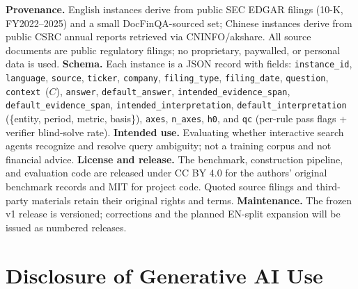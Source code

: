\textbf{Provenance.} English instances derive from public SEC EDGAR filings
(10-K, FY2022--2025) and a small DocFinQA-sourced set; Chinese instances derive
from public CSRC annual reports retrieved via CNINFO/akshare. All source
documents are public regulatory filings; no proprietary, paywalled, or
personal data is used. \textbf{Schema.} Each instance is a JSON record with
fields: \texttt{instance\_id}, \texttt{language}, \texttt{source}, \texttt{ticker},
\texttt{company}, \texttt{filing\_type}, \texttt{filing\_date}, \texttt{question},
\texttt{context}~($C$), \texttt{answer}, \texttt{default\_answer},
\texttt{intended\_evidence\_span}, \texttt{default\_evidence\_span},
\texttt{intended\_interpretation},
\texttt{default\_interpretation}
(\{entity, period, metric, basis\}), \texttt{axes}, \texttt{n\_axes},
\texttt{h0}, and \texttt{qc} (per-rule pass flags + verifier blind-solve rate).
\textbf{Intended use.} Evaluating whether interactive search agents recognize and
resolve query ambiguity; not a training corpus and not financial advice.
\textbf{License and release.} The benchmark, construction pipeline, and evaluation
code are released under CC BY 4.0 for the authors' original benchmark records and MIT for project code. Quoted source filings and third-party materials retain their original rights and terms.
\textbf{Maintenance.} The frozen v1 release is versioned; corrections and the
planned EN-split expansion will be issued as numbered releases.

\ifdefined\acknowledgmentsinmain
\else
\section*{Disclosure of Generative AI Use}

\fi
